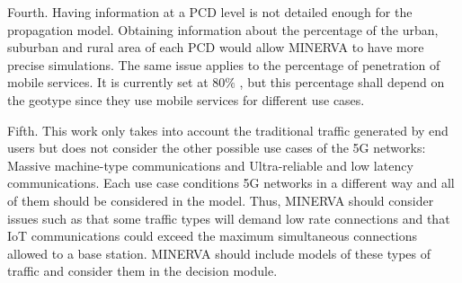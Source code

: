 
\par

Fourth. Having information at a PCD level is not detailed enough for the propagation model. Obtaining information about the percentage of the urban, suburban and rural area of each PCD would allow MINERVA to have more precise simulations. The same issue applies to the percentage of penetration of mobile services. It is currently set at 80$\%$ , but this percentage shall depend on the geotype since they use mobile services for different use cases.\par

Fifth. This work only takes into account the traditional traffic generated by end users but does not consider the other possible use cases of the 5G networks: Massive machine-type communications and Ultra-reliable and low latency communications. Each use case conditions 5G networks in a different way and all of them should be considered in the model. Thus, MINERVA should consider issues such as that some traffic types will demand low rate connections and that IoT communications could exceed the maximum simultaneous connections allowed to a base station. MINERVA should include models of these types of traffic and consider them in the decision module.\par


\vspace{\baselineskip}











